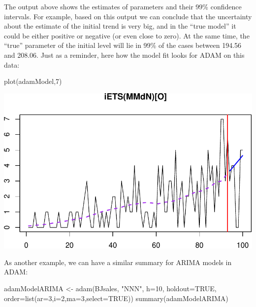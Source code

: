 \documentclass[
]{book}
\newenvironment{Shaded}{\begin{snugshade}}{\end{snugshade}}
\newcommand{\AttributeTok}[1]{\textcolor[rgb]{0.77,0.63,0.00}{#1}}
\newcommand{\ConstantTok}[1]{\textcolor[rgb]{0.00,0.00,0.00}{#1}}
\newcommand{\DecValTok}[1]{\textcolor[rgb]{0.00,0.00,0.81}{#1}}
\newcommand{\FunctionTok}[1]{\textcolor[rgb]{0.00,0.00,0.00}{#1}}
\newcommand{\NormalTok}[1]{#1}
\newcommand{\OtherTok}[1]{\textcolor[rgb]{0.56,0.35,0.01}{#1}}
\newcommand{\StringTok}[1]{\textcolor[rgb]{0.31,0.60,0.02}{#1}}
\theoremstyle{definition}
\theoremstyle{definition}
\theoremstyle{definition}
\theoremstyle{definition}
\theoremstyle{remark}
\begin{document}
The output above shows the estimates of parameters and their 99\% confidence intervals. For example, based on this output we can conclude that the uncertainty about the estimate of the initial trend is very big, and in the ``true model'' it could be either positive or negative (or even close to zero). At the same time, the ``true'' parameter of the initial level will lie in 99\% of the cases between 194.56 and 208.06. Just as a reminder, here how the model fit looks for ADAM on this data:

\begin{Shaded}
\begin{Highlighting}[]
\FunctionTok{plot}\NormalTok{(adamModel,}\DecValTok{7}\NormalTok{)}
\end{Highlighting}
\end{Shaded}

\includegraphics{adam_files/figure-latex/unnamed-chunk-193-1.pdf}

As another example, we can have a similar summary for ARIMA models in ADAM:

\begin{Shaded}
\begin{Highlighting}[]
\NormalTok{adamModelARIMA }\OtherTok{\textless{}{-}} \FunctionTok{adam}\NormalTok{(BJsales, }\StringTok{"NNN"}\NormalTok{, }\AttributeTok{h=}\DecValTok{10}\NormalTok{, }\AttributeTok{holdout=}\ConstantTok{TRUE}\NormalTok{,}
                       \AttributeTok{order=}\FunctionTok{list}\NormalTok{(}\AttributeTok{ar=}\DecValTok{3}\NormalTok{,}\AttributeTok{i=}\DecValTok{2}\NormalTok{,}\AttributeTok{ma=}\DecValTok{3}\NormalTok{,}\AttributeTok{select=}\ConstantTok{TRUE}\NormalTok{))}
\FunctionTok{summary}\NormalTok{(adamModelARIMA)}
\end{Highlighting}
\end{Shaded}
\end{document}
